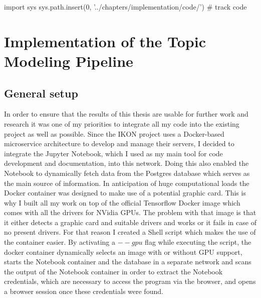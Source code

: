 % 
\begin{pycode}
import sys
sys.path.insert(0, '../chapters/implementation/code/')
# track code

\end{pycode}

\chapter{Implementation of the Topic Modeling Pipeline}
\label{chap:topic_modeling}

\section{General setup}

In order to ensure that the results of this thesis are usable for further work and research it was one of my priorities to integrate all my code into the existing project as well as possible. Since the IKON project uses a Docker-based microservice architecture to develop and manage their servers, I decided to integrate the Jupyter Notebook, which I used as my main tool for code development and documentation, into this network. Doing this also enabled the Notebook to dynamically fetch data from the Postgres database which serves as the main source of information.
In anticipation of huge computational loads the Docker container was designed to make use of a potential graphic card. This is why I built all my work on top of the official Tensorflow Docker image which comes with all the drivers for NVidia GPUs. The problem with that image is that it either detects a graphic card and suitable drivers and works or it fails in case of no present drivers. For that reason I created a Shell script which makes the use of the container easier. By activating a $--gpu$ flag while executing the script, the docker container dynamically selects an image with or without GPU support, starts the Notebook container and the database in a separate network and scans the output of the Notebook container in order to extract the Notebook credentials, which are necessary to access the program via the browser, and opens a browser session once these credentials were found.

